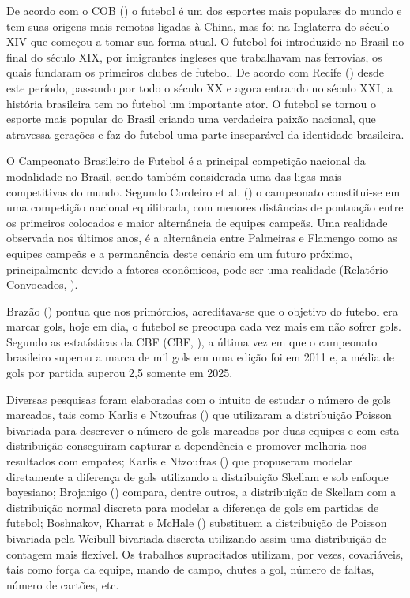 \documentclass[12pt,a4paper]{article}\usepackage[]{graphicx}\usepackage[]{xcolor}
\begin{document}
\indent\par De acordo com o COB (\citeyear{cob2026}) o futebol é um dos esportes mais populares do mundo e tem suas origens mais remotas ligadas à China, mas foi na Inglaterra do século XIV que começou a tomar sua forma atual. O futebol foi introduzido no Brasil no final do século XIX, por imigrantes ingleses que trabalhavam nas ferrovias, os quais fundaram os primeiros clubes de futebol. De acordo com Recife (\citeyear{sport2024}) desde este período, passando por todo o século XX e agora entrando no século XXI, a história brasileira tem no futebol um importante ator. O futebol se tornou o esporte mais popular do Brasil criando uma verdadeira paixão nacional, que atravessa gerações e faz do futebol uma parte inseparável da identidade brasileira.

O Campeonato Brasileiro de Futebol é a principal competição nacional da modalidade no Brasil, sendo também considerada uma das ligas mais competitivas do mundo. 
Segundo Cordeiro et al. (\citeyear{Cordeiro2023}) o campeonato constitui-se em uma competição nacional equilibrada, com menores distâncias de pontuação entre os primeiros colocados e maior alternância de equipes campeãs. Uma realidade observada nos últimos anos, é a alternância entre Palmeiras e Flamengo como as equipes campeãs e a permanência deste cenário em um futuro próximo, principalmente devido a fatores econômicos, pode ser uma realidade (Relatório Convocados, \citeyear{Convocados2026}).

Brazão (\citeyear{Brazao2016}) pontua que nos primórdios, acreditava-se que o objetivo do futebol era marcar gols, hoje em dia, o futebol se preocupa cada vez mais em não sofrer gols. Segundo as estatísticas da CBF (CBF, \citeyear{CBF2026MediaGols}), a última vez em que o campeonato brasileiro superou a marca de mil gols em uma edição foi em 2011 e, a média de gols por partida superou 2,5 somente em 2025.

Diversas pesquisas foram elaboradas com o intuito de estudar o número de gols marcados, tais como Karlis e Ntzoufras (\citeyear{Karlis2003}) que utilizaram a distribuição Poisson bivariada para descrever o número de gols marcados por duas equipes e com esta distribuição conseguiram capturar a dependência e promover melhoria nos resultados com  empates; Karlis e Ntzoufras (\citeyear{Karlis2009}) que propuseram modelar diretamente a diferença de gols utilizando a distribuição Skellam e sob enfoque bayesiano; Brojanigo (\citeyear{brojanigo2013analysis}) compara, dentre outros, a distribuição de Skellam com a distribuição normal discreta para modelar a diferença de gols em partidas de futebol; Boshnakov, Kharrat e McHale (\citeyear{boshnakov2017}) substituem a distribuição de Poisson bivariada pela Weibull bivariada discreta utilizando assim uma distribuição de contagem mais flexível. Os trabalhos supracitados utilizam, por vezes, covariáveis, tais como força da equipe, mando de campo, chutes a gol, número de faltas, número de cartões, etc.
\end{document}
